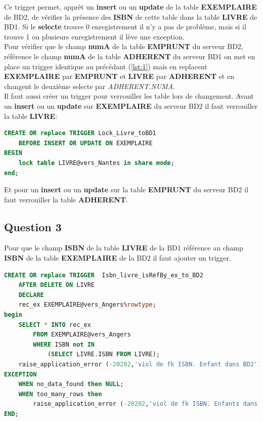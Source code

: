 \documentclass{article}
\begin{document}
Ce trigger permet, apprêt un \textbf{insert} ou un \textbf{update} de la table \textbf{EXEMPLAIRE} de BD2, de vérifier la présence des \textbf{ISBN} de cette table dans la table \textbf{LIVRE} de BD1. Si le \textbf{selecte} %
trouve 0 enregistrement il n'y a pas de problème, mais si il trouve 1 ou plusieurs enregistrement il lève une exception. 
\\

Pour vérifier que le champ \textbf{numA} de la table \textbf{EMPRUNT} du serveur BD2, référence le champ \textbf{numA} de la table \textbf{ADHERENT} du serveur BD1 on met en place un trigger identique au précédant (\ref{lst:1}) mais en replacent \textbf{EXEMPLAIRE} par \textbf{EMPRUNT} et \textbf{LIVRE} par \textbf{ADHERENT} et en changent le deuxième selecte par \textit{ADHERENT.NUMA}.
\\

Il faut aussi créer un trigger pour verrouiller les table lors de changement.
Avant un \textbf{insert} ou un \textbf{update} sur \textbf{EXEMPLAIRE} du serveur BD2 il faut verrouiller la table \textbf{LIVRE}:
\begin{lstlisting}[language=SQL, caption= Trigger]
CREATE OR replace TRIGGER Lock_Livre_toBD1
    BEFORE INSERT OR UPDATE ON EXEMPLAIRE
BEGIN
    lock table LIVRE@vers_Nantes in share mode;
end;
\end{lstlisting}
Et pour un \textbf{insert} ou un \textbf{update} sur la table \textbf{EMPRUNT} du serveur BD2 il faut verrouiller la table \textbf{ADHERENT}.


\subsection{Question 3}
Pour que le champ \textbf{ISBN} de la table \textbf{LIVRE} de la BD1 référence au champ \textbf{ISBN} de la table \textbf{EXEMPLAIRE} de la BD2 il faut ajouter un trigger.

\label{lst:2}
\begin{lstlisting}[language=SQL, caption= Trigger]
CREATE OR replace TRIGGER  Isbn_livre_isRefBy_ex_to_BD2
    AFTER DELETE ON LIVRE
    DECLARE
    rec_ex EXEMPLAIRE@vers_Angers%rowtype;
begin
    SELECT * INTO rec_ex 
        FROM EXEMPLAIRE@vers_Angers
        WHERE ISBN not IN
            (SELECT LIVRE.ISBN FROM LIVRE);
    raise_application_error (-20202,'viol de fk ISBN. Enfant dans BD2'); 
EXCEPTION
    WHEN no_data_found then NULL;
    WHEN too_many_rows then
        raise_application_error (-20202,'viol de fk ISBN. Enfants dans BD2');
END;
\end{lstlisting}
\end{document}
